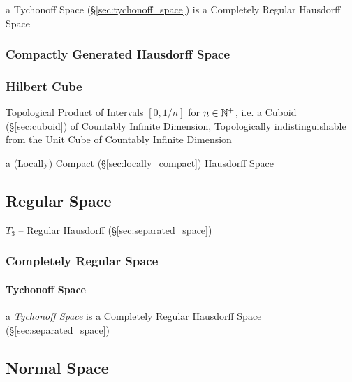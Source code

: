 a Tychonoff Space (\S\ref{sec:tychonoff_space}) is a Completely Regular
Hausdorff Space



\subsubsection{Compactly Generated Hausdorff Space}
\label{sec:compact_hausdorff}



\subsubsection{Hilbert Cube}\label{sec:hilbert_cube}

Topological Product of Intervals $[0, 1/n]$ for $n \in \mathbb{N}^+$, i.e. a Cuboid
(\S\ref{sec:cuboid}) of Countably Infinite Dimension, Topologically
indistinguishable from the Unit Cube of Countably Infinite Dimension

a (Locally) Compact (\S\ref{sec:locally_compact}) Hausdorff Space



\subsection{Regular Space}\label{sec:regular_space}

$\xspace{T}_3$ -- Regular Hausdorff (\S\ref{sec:separated_space})



\subsubsection{Completely Regular Space}\label{sec:completely_regular_space}

\paragraph{Tychonoff Space}\label{sec:completely_regular_space}

a \emph{Tychonoff Space} is a Completely Regular Hausdorff Space
(\S\ref{sec:separated_space})



\subsection{Normal Space}\label{sec:normal_space}

